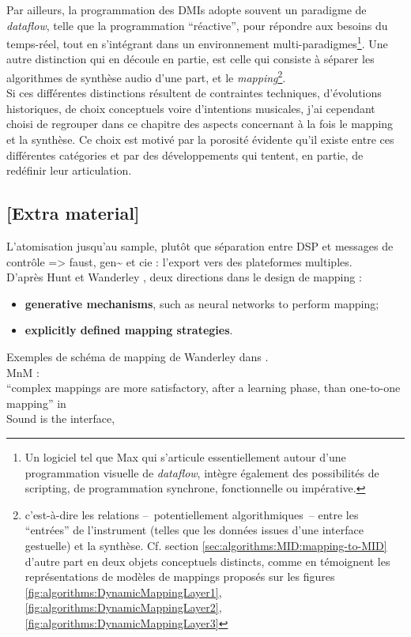 \indent Par ailleurs, la programmation des \glspl{DMI} adopte souvent un paradigme de \textit{dataflow}, telle que la programmation ``réactive'', pour répondre aux besoins du temps-réel, tout en s'intégrant dans un environnement multi-paradigmes\footnote{Un logiciel tel que Max qui s'articule essentiellement autour d'une programmation visuelle de \textit{dataflow}, intègre également des possibilités de scripting, de programmation synchrone, fonctionnelle ou impérative.}. Une autre distinction qui en découle en partie, est celle qui consiste à séparer les algorithmes de synthèse audio d'une part, et le \textit{mapping}\footnote{c'est-à-dire les relations --~potentiellement algorithmiques~-- entre les ``entrées'' de l'instrument (telles que les données issues d'une interface gestuelle) et la synthèse. Cf. section \ref{sec:algorithms:MID:mapping-to-MID} d'autre part en deux objets conceptuels distincts, comme en témoignent les représentations de modèles de mappings proposés sur les figures \ref{fig:algorithms:DynamicMappingLayer1}, \ref{fig:algorithms:DynamicMappingLayer2}, \ref{fig:algorithms:DynamicMappingLayer3}}.\\
\indent Si ces différentes distinctions résultent de contraintes techniques, d'évolutions historiques, de choix conceptuels voire d'intentions musicales, j'ai cependant choisi de regrouper dans ce chapitre des aspects concernant à la fois le mapping et la synthèse. Ce choix est motivé par la porosité évidente qu'il existe entre ces différentes catégories et par des développements qui tentent, en partie, de redéfinir leur articulation.

\subsection*{[Extra material]}

L’atomisation jusqu’au sample, plutôt que séparation entre DSP et messages de contrôle
=> faust, gen\textasciitilde{ } et cie : l’export vers des plateformes multiples.\\
\indent D'après Hunt et Wanderley \cite{hunt_mapping_2002}, deux directions dans le design de mapping :
\vspace{-1em}
\begin{itemize}[noitemsep]
	\item \textbf{generative mechanisms}, such as neural networks to perform mapping;
	\item \textbf{explicitly defined mapping strategies}.
\end{itemize}
Exemples de schéma de mapping de Wanderley dans \cite{wanderley_escher-modeling_1998}.\\
MnM : \cite{bevilacqua_mnm_2005}\\
``complex mappings are more satisfactory, after a learning phase, than one-to-one mapping'' in \cite{wanderley_mapping_2002}\\
Sound is the interface, \cite{di_scipio_sound_2003}


